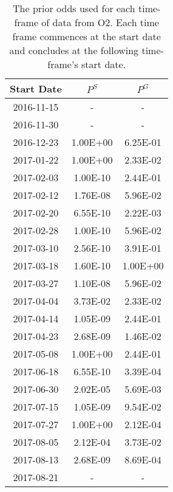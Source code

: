\begin{table}
\centering
\caption{The prior odds used for each time-frame of data from O2. Each time frame commences at the start date and concludes at the following time-frame's start date.
    }
\label{tab:priorodds}
\def\arraystretch{1.5} 
\setlength{\tabcolsep}{0.5em}
\begin{tabular}{c|cc}

 Start Date &    $P^S$ &    $P^G$ \\
\midrule
 2016-11-15 &        - &        - \\
 2016-11-30 &        - &        - \\
 2016-12-23 & 1.00E+00 & 6.25E-01 \\
 2017-01-22 & 1.00E+00 & 2.33E-02 \\
 2017-02-03 & 1.00E-10 & 2.44E-01 \\
 2017-02-12 & 1.76E-08 & 5.96E-02 \\
 2017-02-20 & 6.55E-10 & 2.22E-03 \\
 2017-02-28 & 1.00E-10 & 5.96E-02 \\
 2017-03-10 & 2.56E-10 & 3.91E-01 \\
 2017-03-18 & 1.60E-10 & 1.00E+00 \\
 2017-03-27 & 1.10E-08 & 5.96E-02 \\
 2017-04-04 & 3.73E-02 & 2.33E-02 \\
 2017-04-14 & 1.05E-09 & 2.44E-01 \\
 2017-04-23 & 2.68E-09 & 1.46E-02 \\
 2017-05-08 & 1.00E+00 & 2.44E-01 \\
 2017-06-18 & 6.55E-10 & 3.39E-04 \\
 2017-06-30 & 2.02E-05 & 5.69E-03 \\
 2017-07-15 & 1.05E-09 & 9.54E-02 \\
 2017-07-27 & 1.00E+00 & 2.12E-04 \\
 2017-08-05 & 2.12E-04 & 3.73E-02 \\
 2017-08-13 & 2.68E-09 & 8.69E-04 \\
 2017-08-21 &        - &        - \\

\end{tabular}
\end{table}
